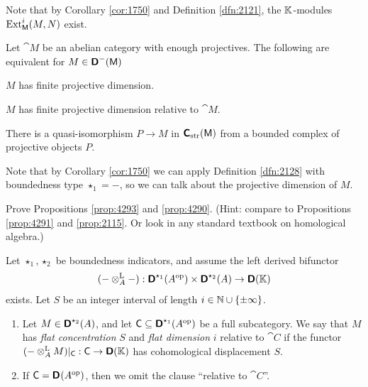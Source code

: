 Note that by Corollary \ref{cor:1750} and Definition \ref{dfn:2121}, the 
$\mathbb{K}$-modules $\operatorname{Ext}^i_{\operatorname{\mathsf{M}}}(M, N)$ exist.

\begin{prop} \label{prop:4290}
Let $\cat{M}$ be an abelian category with enough projectives. The following are 
equivalent for $M \in \boldsymbol{\mathsf{D}}^-(\operatorname{\mathsf{M}})$~\tup{:}
\begin{enumerate}
 $M$ has finite projective dimension.

 $M$ has finite projective dimension relative to 
$\cat{M}$.

 There is a quasi-isomorphism $P \to M$ in 
$\boldsymbol{\mathsf{C}}_{\mathrm{str}}(\operatorname{\mathsf{M}})$ from a bounded complex of projective objects 
$P$.
\end{enumerate}
\end{prop}

Note that by Corollary \ref{cor:1750} we can apply Definition \ref{dfn:2128} 
with boundedness type $\star_1 = -$, so we can talk about the projective 
dimension of $M$. 

\begin{exer} \label{exer:2390}
Prove Propositions \ref{prop:4293} and \ref{prop:4290}. (Hint: compare to 
Propositions \ref{prop:4291} and \ref{prop:2115}.
Or look in any standard textbook on homological algebra.)
\end{exer}

\begin{dfn} \label{dfn:2390} 
Let $\star_1, \star_2$ be boundedness indicators, and assume the left 
derived bifunctor 
\[ (- \otimes^{\mathrm{L}}_A -) : 
\boldsymbol{\mathsf{D}}^{\star_1}(A^{\mathrm{op}}) \times 
\boldsymbol{\mathsf{D}}^{\star_2}(A) \to \boldsymbol{\mathsf{D}}(\mathbb{K}) \]
exists. Let $S$ be an integer interval of length 
$i\in \mathbb{N} \cup \{\pm  \infty \}$.
\begin{enumerate}
\item Let $M \in \boldsymbol{\mathsf{D}}^{\star_2}(A)$, and let 
$\operatorname{\mathsf{C}} \subseteq \boldsymbol{\mathsf{D}}^{\star_1}(A^{\mathrm{op}})$ be a full  
subcategory. We say that $M$ has {\em flat concentration} $S$
and {\em flat dimension}%
%
$i$ relative to $\cat{C}$ if the functor
$(- \otimes^{\mathrm{L}}_A M) |_{\operatorname{\mathsf{C}}} : \operatorname{\mathsf{C}} \to \boldsymbol{\mathsf{D}}(\mathbb{K})$
has cohomological displacement $S$.

\item If $\operatorname{\mathsf{C}} = \boldsymbol{\mathsf{D}}^{}(A^{\mathrm{op}})$,
then we omit the clause ``relative to $\cat{C}$''. 
\end{enumerate}
\end{dfn}

